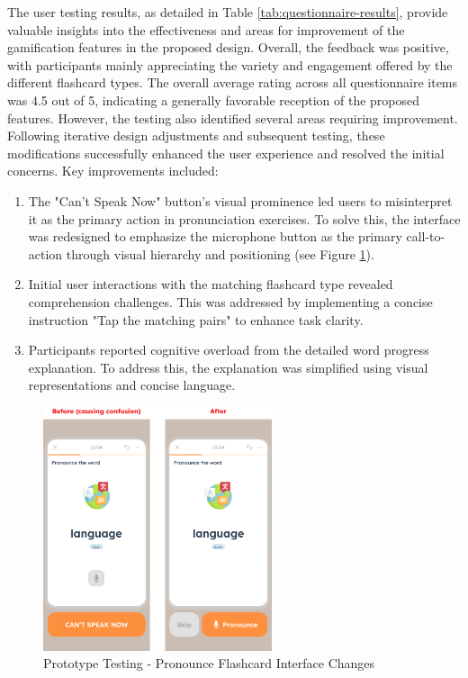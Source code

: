 The user testing results, as detailed in Table \ref{tab:questionnaire-results}, provide valuable insights into the effectiveness and areas for improvement of the gamification features in the proposed design. Overall, the feedback was positive, with participants mainly appreciating the variety and engagement offered by the different flashcard types. The overall average rating across all questionnaire items was 4.5 out of 5, indicating a generally favorable reception of the proposed features. However, the testing also identified several areas requiring improvement. Following iterative design adjustments and subsequent testing, these modifications successfully enhanced the user experience and resolved the initial concerns. Key improvements included:
\begin{enumerate}
    \item The "Can't Speak Now" button's visual prominence led users to misinterpret it as the primary action in pronunciation exercises. To solve this, the interface was redesigned to emphasize the microphone button as the primary call-to-action through visual hierarchy and positioning (see Figure \ref{fig:em-testing-pronunciation-before-after}).
    
    \item Initial user interactions with the matching flashcard 
    type revealed comprehension challenges. This was addressed by implementing a concise instruction "Tap the matching pairs" to enhance task clarity.
    
    \item Participants reported cognitive overload from the detailed word progress explanation. To address this, the explanation was simplified using visual representations and concise language.
\end{enumerate}
\begin{figure}[!h]
    \centering
    \includegraphics[width=0.60\textwidth]{src/figures/em-testing-pronunciation-before-after.png}
    \caption{Prototype Testing - Pronounce Flashcard Interface Changes}
    \label{fig:em-testing-pronunciation-before-after}
\end{figure}

